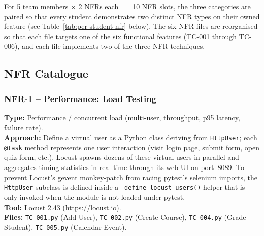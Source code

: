 \documentclass[twoside,final]{hcmut-report}
\begin{document}
For 5 team members $\times$ 2 NFRs each $=$ 10 NFR slots, the three categories are paired so that every student demonstrates two distinct NFR types on their owned feature (see Table~\ref{tab:per-student-nfr} below). The six NFR files are reorganised so that each file targets one of the six functional features (TC-001 through TC-006), and each file implements two of the three NFR techniques.

\subsection{NFR Catalogue}

\subsubsection{NFR-1 -- Performance: Load Testing}
\textbf{Type:} Performance / concurrent load (multi-user, throughput, p95 latency, failure rate).\\
\textbf{Approach:} Define a virtual user as a Python class deriving from \texttt{HttpUser}; each \texttt{@task} method represents one user interaction (visit login page, submit form, open quiz form, etc.). Locust spawns dozens of these virtual users in parallel and aggregates timing statistics in real time through its web UI on port~8089. To prevent Locust's gevent monkey-patch from racing pytest's selenium imports, the \texttt{HttpUser} subclass is defined inside a \texttt{\_define\_locust\_users()} helper that is only invoked when the module is not loaded under pytest.\\
\textbf{Tool:} Locust 2.43 (\url{https://locust.io}).\\
\textbf{Files:} \texttt{TC-001.py} (Add User), \texttt{TC-002.py} (Create Course), \texttt{TC-004.py} (Grade Student), \texttt{TC-005.py} (Calendar Event).
\end{document}
